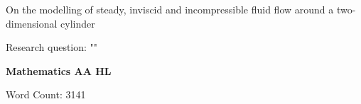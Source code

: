 \begin{titlepage}
	\begin{center}
		\vspace*{2cm}
		\Large On the modelling of steady, inviscid and incompressible fluid flow around a two-dimensional cylinder

		\vspace{1.5cm}
		\normalsize Research question: "\textbf{\researchquestion}"

		\vspace{1.5cm}
		\large\textbf{Mathematics AA HL}

		\vfill
		\color{darkgray} Word Count: 3141
	\end{center}
\end{titlepage}

\tableofcontents\newpage